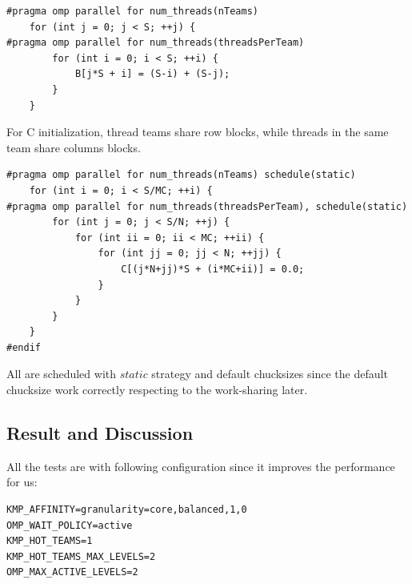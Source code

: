 \documentclass[article]{scrartcl}
\begin{document}
\begin{lstlisting}[frame=single]
#pragma omp parallel for num_threads(nTeams)
    for (int j = 0; j < S; ++j) {
#pragma omp parallel for num_threads(threadsPerTeam)
        for (int i = 0; i < S; ++i) {
            B[j*S + i] = (S-i) + (S-j);
        }   
    }   

\end{lstlisting}

For C initialization, thread teams share row blocks, while threads in the same team share columns blocks.


\begin{lstlisting}[frame=single]
#pragma omp parallel for num_threads(nTeams) schedule(static)
    for (int i = 0; i < S/MC; ++i) {
#pragma omp parallel for num_threads(threadsPerTeam), schedule(static) 
        for (int j = 0; j < S/N; ++j) {
            for (int ii = 0; ii < MC; ++ii) {
                for (int jj = 0; jj < N; ++jj) {
                    C[(j*N+jj)*S + (i*MC+ii)] = 0.0;
                }   
            }   
        }   
    }   
#endif
\end{lstlisting}

All are scheduled with $static$ strategy and default chucksizes since the default chucksize work correctly respecting to the work-sharing later.
\subsection{Result and Discussion}
All the tests are with following configuration since it improves the performance for us:
\begin{lstlisting}
KMP_AFFINITY=granularity=core,balanced,1,0   
OMP_WAIT_POLICY=active                        
KMP_HOT_TEAMS=1                               
KMP_HOT_TEAMS_MAX_LEVELS=2                    
OMP_MAX_ACTIVE_LEVELS=2
\end{lstlisting}
\end{document}
